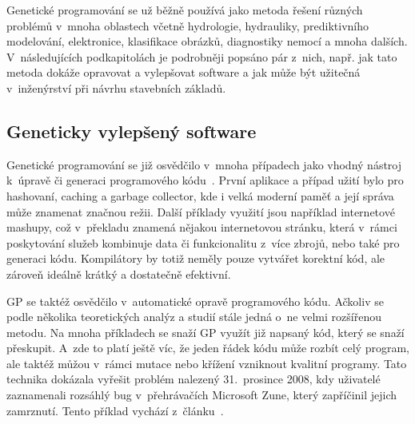 Genetické programování se už běžně používá jako metoda řešení různých problémů v~mnoha oblastech včetně hydrologie, hydrauliky, prediktivního modelování, elektronice, klasifikace obrázků, diagnostiky nemocí a mnoha dalších. V~následujících podkapitolách je podrobněji popsáno pár z~nich, např. jak tato metoda dokáže opravovat a vylepšovat software a jak může být užitečná v~inženýrství při návrhu stavebních základů.

\subsection*{Geneticky vylepšený software}
Genetické programování se již osvědčilo v~mnoha případech jako vhodný nástroj k~úpravě či generaci programového kódu~\cite{ApplicationOfGP}. První aplikace a případ užití bylo pro hashovaní, caching a garbage collector, kde i velká moderní paměť a její správa může znamenat značnou režii. Další příklady využití jsou například internetové mashupy, což v~překladu znamená nějakou internetovou stránku, která v~rámci poskytování služeb kombinuje data či funkcionalitu z~více zbrojů, nebo také pro generaci kódu. Kompilátory by totiž neměly pouze vytvářet korektní kód, ale zároveň ideálně krátký a dostatečně efektivní. 

GP se taktéž osvědčilo v~automatické opravě programového kódu. Ačkoliv se podle několika teoretických analýz a studií stále jedná o~ne velmi rozšířenou metodu. Na mnoha příkladech se snaží GP využít již napsaný kód, který se snaží přeskupit. A~zde to platí ještě víc, že jeden řádek kódu může rozbít celý program, ale taktéž můžou v~rámci mutace nebo křížení vzniknout kvalitní programy. Tato technika dokázala vyřešit problém nalezený 31.~prosince 2008, kdy uživatelé zaznamenali rozsáhlý bug v~přehrávačích Microsoft Zune, který zapříčinil jejich zamrznutí. Tento příklad vychází z~článku~\cite{AutomaticBugFixing}.

